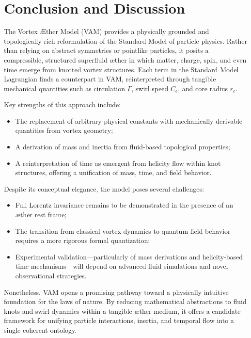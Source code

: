 \section{Conclusion and Discussion}

The Vortex Æther Model (VAM) provides a physically grounded and topologically rich reformulation of the Standard Model of particle physics. Rather than relying on abstract symmetries or pointlike particles, it posits a compressible, structured superfluid æther in which matter, charge, spin, and even time emerge from knotted vortex structures. Each term in the Standard Model Lagrangian finds a counterpart in VAM, reinterpreted through tangible mechanical quantities such as circulation $\Gamma$, swirl speed $C_e$, and core radius $r_c$.

Key strengths of this approach include:
\begin{itemize}
    \item The replacement of arbitrary physical constants with mechanically derivable quantities from vortex geometry;
    \item A derivation of mass and inertia from fluid-based topological properties;
    \item A reinterpretation of time as emergent from helicity flow within knot structures, offering a unification of mass, time, and field behavior.
\end{itemize}

Despite its conceptual elegance, the model poses several challenges:
\begin{itemize}
    \item Full Lorentz invariance remains to be demonstrated in the presence of an æther rest frame;
    \item The transition from classical vortex dynamics to quantum field behavior requires a more rigorous formal quantization;
    \item Experimental validation—particularly of mass derivations and helicity-based time mechanisms—will depend on advanced fluid simulations and novel observational strategies.
\end{itemize}

Nonetheless, VAM opens a promising pathway toward a physically intuitive foundation for the laws of nature. By reducing mathematical abstractions to fluid knots and swirl dynamics within a tangible æther medium, it offers a candidate framework for unifying particle interactions, inertia, and temporal flow into a single coherent ontology.
